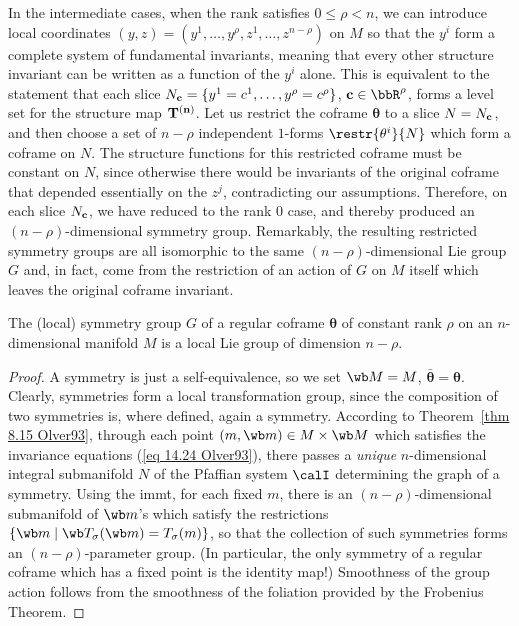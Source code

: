 In the intermediate cases, when the rank satisfies $0\leq \rho<n$, we can introduce local coordinates $(y,z)=(y^1,\ldots,y^\rho,z^1,\ldots,z^{n-\rho})$ on $M$ so that the $y^i$ form a complete system of fundamental invariants, meaning that every other structure invariant can be written as a function of the $y^i$ alone. This is equivalent to the statement that each slice $N_{\bf c}=\{y^1=c^1,\ldots,y^\rho=c^\rho\}$, $\bf{c}\in\bbR^\rho$, forms a level set for the structure map $\bf{T}^{(n)}$. Let us restrict the coframe $\bm\theta$ to a slice $N=N_{\bf c}$, and then choose a set of $n-\rho$ independent $1$-forms $\restr{\theta^i}{N}$ which form a coframe on $N$. The structure functions for this restricted coframe must be constant on $N$, since otherwise there would be invariants of the original coframe that depended essentially on the $z^j$, contradicting our assumptions. Therefore, on each slice $N_{\bf c}$, we have reduced to the rank $0$ case, and thereby produced an $(n-\rho)$-dimensional symmetry group. Remarkably, the resulting restricted symmetry groups are all isomorphic to the same $(n-\rho)$-dimensional Lie group $G$ and, in fact, come from the restriction of an action of $G$ on $M$ itself which leaves the original coframe invariant.

\begin{thm}
    The (local) symmetry group $G$ of a regular coframe $\bm\theta$ of constant rank $\rho$ on an $n$-dimensional manifold $M$ is a local Lie group of dimension $n-\rho$.
\end{thm}
\begin{proof}
    A symmetry is just a self-equivalence, so we set $\wb M=M$, $\bar{\bm\theta}=\bm\theta$. Clearly, symmetries form a local transformation group, since the composition of two symmetries is, where defined, again a symmetry. According to Theorem~\ref{thm 8.15 Olver93}, through each point $(m,\wb m)\in M\times\wb M$ which satisfies the invariance equations (\ref{eq 14.24 Olver93}), there passes a \emph{unique} $n$-dimensional integral submanifold $N$ of the Pfaffian system $\calI$ determining the graph of a symmetry. Using the \gls{immt}, for each fixed $m$, there is an $(n-\rho)$-dimensional submanifold of $\wb m$'s which satisfy the restrictions $\{\wb m\mid \wb T_\sigma(\wb m)=T_\sigma(m)\}$, so that the collection of such symmetries forms an $(n-\rho)$-parameter group. (In particular, the only symmetry of a regular coframe which has a fixed point is the identity map!) Smoothness of the group action follows from the smoothness of the foliation provided by the Frobenius Theorem.
\end{proof}


